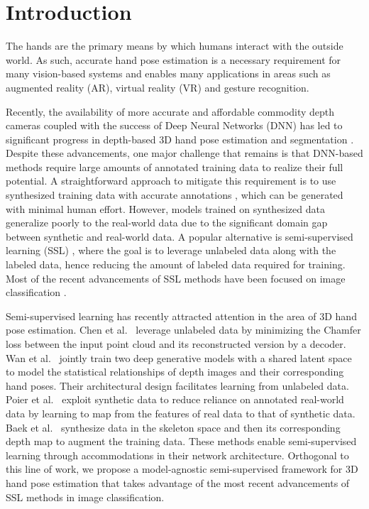 \documentclass{article}
\begin{document}
\section{Introduction}
The hands are the primary means by which humans interact with the outside world. As such, accurate hand pose estimation is a necessary requirement for many vision-based systems and enables many applications in areas such as augmented reality (AR), virtual reality (VR) and gesture recognition.
\par
Recently, the availability of more accurate and affordable commodity depth cameras coupled with the success of Deep Neural Networks (DNN) has led to significant progress in depth-based 3D hand pose estimation and segmentation \cite{yuan2018depth,malik2020handvoxnet,chen2019so,du2019crossinfonet,xiong2019a2j,ge2018point,wan2018dense,baek2018augmented,tompson2014real,bojja2019handseg}. Despite these advancements, one major challenge that remains is that DNN-based methods require large amounts of annotated training data to realize their full potential. A straightforward approach to mitigate this requirement is to use synthesized training data with accurate annotations \cite{poier2019murauer}, which can be generated with minimal human effort. However, models trained on synthesized data generalize poorly to the real-world data due to the significant domain gap between synthetic and real-world data. A popular alternative is semi-supervised learning (SSL) \cite{chapelle2009semi}, where the goal is to leverage unlabeled data along with the labeled data, hence reducing the amount of labeled data required for training. Most of the recent advancements of SSL methods have been focused on image classification \cite{demiriz1999semi,gammerman2013learning,joachims1999transductive,grandvalet2005semi,blum1998combining,nigam2000analyzing,belkin2004regularization,blum2001learning,he2018amc,wang2007label,li2021comatch}.
\par
Semi-supervised learning has recently attracted attention in the area of 3D hand pose estimation. Chen et al.~\cite{chen2019so} leverage unlabeled data by minimizing the Chamfer loss between the input point cloud and its reconstructed version by a decoder. Wan et al.~\cite{wan2017crossing} jointly train two deep generative models with a shared latent space to model the statistical relationships of depth images and their corresponding hand poses. Their architectural design facilitates learning from unlabeled data. Poier et al.~\cite{poier2019murauer} exploit synthetic data to reduce reliance on annotated real-world data by learning to map from the features of real data to that of synthetic data. Baek et al.~\cite{baek2018augmented} synthesize data in the skeleton space and then its corresponding depth map to augment the training data. These methods enable semi-supervised learning through accommodations in their network architecture. Orthogonal to this line of work, we propose a model-agnostic semi-supervised framework for 3D hand pose estimation that takes advantage of the most recent advancements of SSL methods in image classification.
\end{document}
